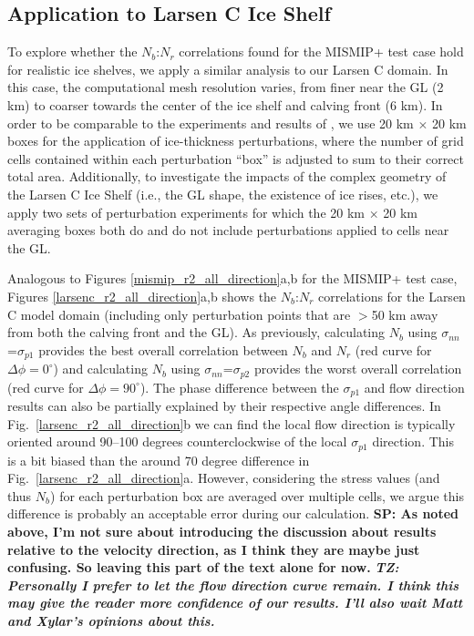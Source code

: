 \documentclass[review,oneside]{igs}
\begin{document}
\subsection{Application to Larsen C Ice Shelf}

To explore whether the $N_b$:$N_r$ correlations found for the MISMIP+ test case hold for realistic ice shelves, we apply a similar analysis to our Larsen C domain. In this case, the computational mesh resolution varies, from finer near the GL (2 km) to coarser towards the center of the ice shelf and calving front (6 km). In order to be comparable to the experiments and results of \citet{reese2018}, we use 20 km $\times$ 20 km boxes for the application of ice-thickness perturbations, where the number of grid cells contained within each perturbation ``box'' is adjusted to sum to their correct total area. Additionally, to investigate the impacts of the complex geometry of the Larsen C Ice Shelf (i.e., the GL shape, the existence of ice rises, etc.), we apply two sets of perturbation experiments for which the 20 km $\times$ 20 km averaging boxes both do and do not include perturbations applied to cells near the GL. %

Analogous to Figures \ref{mismip_r2_all_direction}a,b for the MISMIP+ test case, Figures \ref{larsenc_r2_all_direction}a,b shows the $N_b$:$N_r$ correlations for the Larsen C model domain (including only perturbation points that are $>$50 km away from both the calving front and the GL). As previously, calculating $N_b$ using $\sigma_{nn}$=$\sigma_{p1}$ provides the best overall correlation between $N_b$ and $N_r$ (red curve for $\Delta\phi=0^\circ$) and calculating $N_b$ using $\sigma_{nn}$=$\sigma_{p2}$ provides the worst overall correlation (red curve for $\Delta\phi=90^\circ$). The phase difference between the $\sigma_{p1}$ and flow direction results can also be partially explained by their respective angle differences. In Fig.~\ref{larsenc_r2_all_direction}b we can find the local flow direction is typically oriented around 90--100 degrees counterclockwise of the local $\sigma_{p1}$ direction. This is a bit biased than the around 70 degree difference in Fig.~\ref{larsenc_r2_all_direction}a. However, considering the stress values (and thus $N_b$) for each perturbation box are averaged over multiple cells, we argue this difference is probably an acceptable error during our calculation. \textbf{SP: As noted above, I'm not sure about introducing the discussion about results relative to the velocity direction, as I think they are maybe just confusing. So leaving this part of the text alone for now.} \textit{\textbf{TZ: Personally I prefer to let the flow direction curve remain. I think this may give the reader more confidence of our results. I'll also wait Matt and Xylar's opinions about this.}} 
\end{document}
